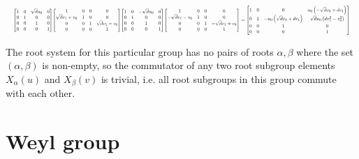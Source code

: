 \documentclass[11pt]{article}
\theoremstyle{definition}
\begin{document}
\[
\scaletoalign{\textwidth}{{\left[\begin{matrix}1 & 0 & \sqrt{d} u_{0} & 0\\0 & 1 & 0 & 0\\0 & 0 & 1 & 0\\0 & 0 & 0 & 1\end{matrix}\right]} {\left[\begin{matrix}1 & 0 & 0 & 0\\\sqrt{d} v_{1} + v_{0} & 1 & 0 & 0\\0 & 0 & 1 & \sqrt{d} v_{1} - v_{0}\\0 & 0 & 0 & 1\end{matrix}\right]} {\left[\begin{matrix}1 & 0 & - \sqrt{d} u_{0} & 0\\0 & 1 & 0 & 0\\0 & 0 & 1 & 0\\0 & 0 & 0 & 1\end{matrix}\right]} {\left[\begin{matrix}1 & 0 & 0 & 0\\- \sqrt{d} v_{1} - v_{0} & 1 & 0 & 0\\0 & 0 & 1 & - \sqrt{d} v_{1} + v_{0}\\0 & 0 & 0 & 1\end{matrix}\right]} = {\left[\begin{matrix}1 & 0 & 0 & u_{0} \left(- \sqrt{d} v_{0} + d v_{1}\right)\\0 & 1 & - u_{0} \left(\sqrt{d} v_{0} + d v_{1}\right) & \sqrt{d} u_{0} \left(d v_{1}^{2} - v_{0}^{2}\right)\\0 & 0 & 1 & 0\\0 & 0 & 0 & 1\end{matrix}\right]}}
\]


\else
The root system for this particular group has no pairs of roots $\alpha, \beta$ where the set $(\alpha, \beta)$ is non-empty, so the commutator of any two root subgroup elements $X_\alpha(u)$ and $X_\beta(v)$ is trivial, i.e. all root subgroups in this group commute with each other.
\fi

\newpage
\section{Weyl group}
\end{document}
